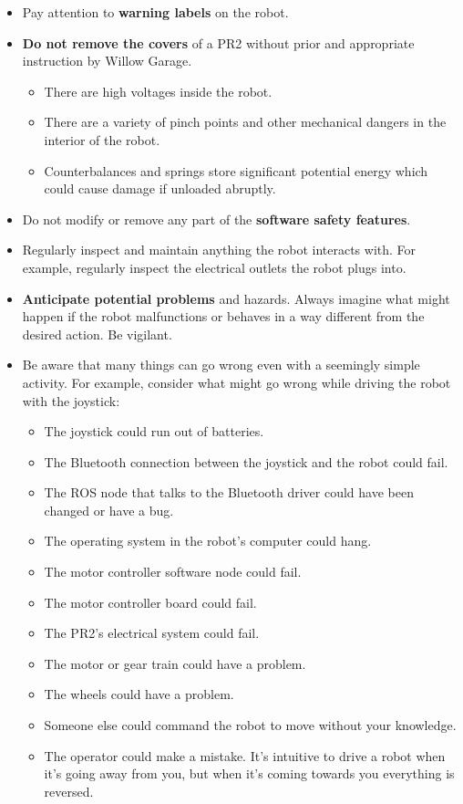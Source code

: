 \begin{itemize}
\begin{itemize}
\end{itemize}
\item Pay attention to {\bf warning labels} on the robot.
\item {\bf Do not remove the covers} of a PR2 without prior and appropriate instruction by Willow Garage.
\begin{itemize}
\item There are high voltages inside the robot.
\item There are a variety of pinch points and other mechanical dangers in the interior of the robot.
\item Counterbalances and springs store significant potential energy which could cause damage if unloaded abruptly.
\end{itemize}
\item Do not modify or remove any part of the {\bf software safety features}.
\item Regularly inspect and maintain anything the robot interacts with.  For example, regularly inspect the electrical outlets the robot plugs into.
\item {\bf Anticipate potential problems} and hazards.  Always imagine what might happen if the robot malfunctions or behaves in a way different from the desired action.  Be vigilant.
\item Be aware that many things can go wrong even with a seemingly simple activity. For example, consider what might go wrong while driving the robot with the joystick:
\begin{itemize}
\item The joystick could run out of batteries.
\item The Bluetooth connection between the joystick and the robot could fail.
\item The ROS node that talks to the Bluetooth driver could have been changed or have a bug.
\item The operating system in the robot's computer could hang.
\item The motor controller software node could fail.
\item The motor controller board could fail.
\item The PR2's electrical system could fail.
\item The motor or gear train could have a problem.
\item The wheels could have a problem.
\item Someone else could command the robot to move without your knowledge.
\item The operator could make a mistake. It's intuitive to drive a robot when it's going away from you, but when it's coming towards you everything is reversed.
\end{itemize}
\end{itemize}

